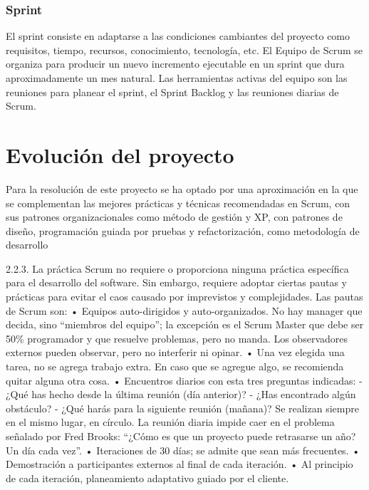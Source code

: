 \subsubsection{Sprint}
 El sprint consiste en adaptarse a las condiciones cambiantes del proyecto como requisitos, tiempo, recursos, conocimiento, tecnología, etc. El Equipo de Scrum se organiza para producir un nuevo incremento ejecutable en un sprint que dura aproximadamente un mes natural. Las herramientas activas del equipo son las reuniones para planear el sprint, el Sprint Backlog y las reuniones diarias de Scrum.



\section{Evolución del proyecto}

Para la resolución de este proyecto se ha optado por una aproximación en la que se complementan las mejores prácticas y técnicas recomendadas en Scrum, con sus patrones organizacionales como método de gestión y XP, con patrones de diseño, programación guiada por pruebas y refactorización, como metodología de desarrollo

2.2.3. La práctica
Scrum no requiere o proporciona ninguna práctica específica para el desarrollo del software. Sin embargo, requiere adoptar ciertas pautas y prácticas para evitar el caos causado por imprevistos y complejidades.
Las pautas de Scrum son:
• Equipos auto-dirigidos y auto-organizados. No hay manager que decida, sino “miembros del equipo”; la excepción es el Scrum Master que debe ser 50\% programador y que resuelve problemas, pero no manda. Los observadores externos pueden observar, pero no interferir ni opinar.
• Una vez elegida una tarea, no se agrega trabajo extra. En caso que se agregue algo, se recomienda quitar alguna otra cosa.
• Encuentros diarios con esta tres preguntas indicadas:
- ¿Qué has hecho desde la última reunión (día anterior)?
- ¿Has encontrado algún obstáculo?
- ¿Qué harás para la siguiente reunión (mañana)?
Se realizan siempre en el mismo lugar, en círculo. La reunión diaria impide caer en el problema señalado por Fred Brooks: “¿Cómo es que un proyecto puede retrasarse un año? Un día cada vez”.
• Iteraciones de 30 días; se admite que sean más frecuentes.
• Demostración a participantes externos al final de cada iteración.
• Al principio de cada iteración, planeamiento adaptativo guiado por el cliente.


